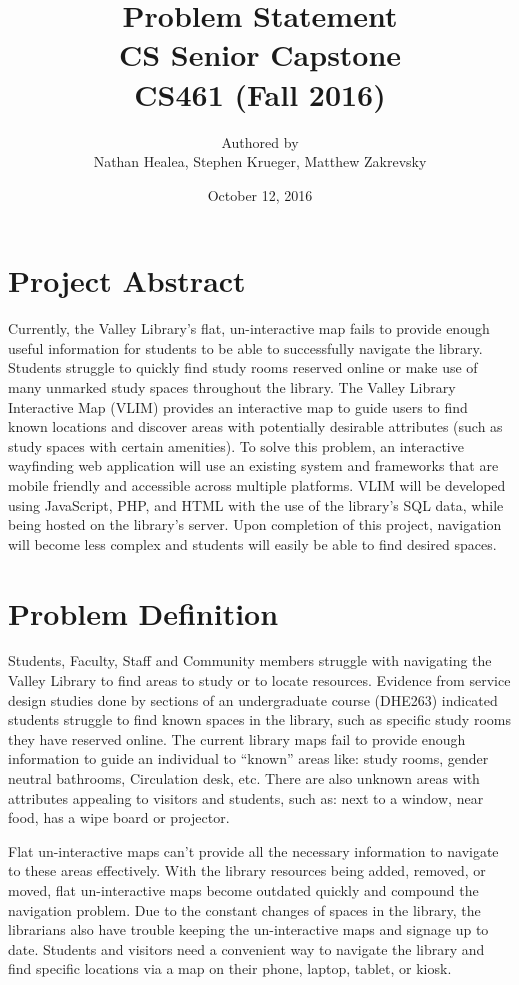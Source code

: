 \documentclass[letterpaper,10pt,titlepage]{article}
\title{Problem Statement \\ CS Senior Capstone \\ \vspace{2mm}\small CS461 (Fall 2016)}
\author{Authored by \\ Nathan Healea, Stephen Krueger, Matthew Zakrevsky}
\date{October 12, 2016}
\begin{document}
\maketitle
\newpage

\section*{Project Abstract}
Currently, the Valley Library's flat, un-interactive map fails to provide enough useful information for students to be able to successfully navigate the library. Students struggle to quickly find study rooms reserved online or make use of many unmarked study spaces throughout the library. The Valley Library Interactive Map (VLIM) provides an interactive map to guide users to find known locations and discover areas with potentially desirable attributes (such as study spaces with certain amenities). To solve this problem, an interactive wayfinding web application will use an existing system and frameworks that are mobile friendly and accessible across multiple platforms. VLIM will be developed using JavaScript, PHP, and HTML with the use of the library's SQL data, while being hosted on the library's server. Upon completion of this project, navigation will become less complex and students will easily be able to find desired spaces.

\section*{Problem Definition}
Students, Faculty, Staff and Community members struggle with navigating the Valley Library to find areas to study or to locate resources. Evidence from service design studies done by sections of an undergraduate course (DHE263) indicated students struggle to find known spaces in the library, such as specific study rooms they have reserved online. The current library maps fail to provide enough information to guide an individual to “known” areas like: study rooms, gender neutral bathrooms, Circulation desk, etc. There are also unknown areas with attributes appealing to visitors and students, such as: next to a window, near food, has a wipe board or projector. 

Flat un-interactive maps can’t provide all the necessary information to navigate to these areas effectively. With the library resources being added, removed, or moved, flat un-interactive maps become outdated quickly and compound the navigation problem. Due to the constant changes of spaces in the library, the librarians also have trouble keeping the un-interactive maps and signage up to date. Students and visitors need a convenient way to navigate the library and find specific locations via a map on their phone, laptop, tablet, or kiosk. 
\end{document}
